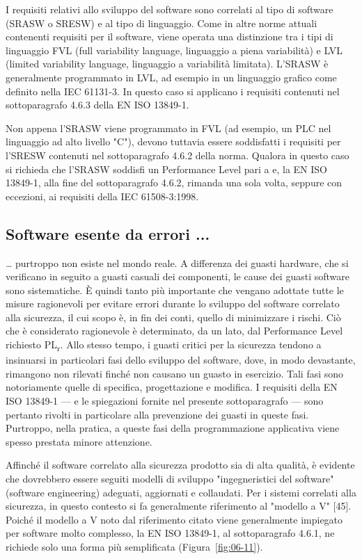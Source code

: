 I requisiti relativi allo sviluppo del software sono correlati al tipo di software (SRASW o SRESW) e al tipo di linguaggio. Come in altre norme attuali contenenti requisiti per il software, viene operata una distinzione tra i tipi di linguaggio FVL (full variability language, linguaggio a piena variabilità) e LVL (limited variability language, linguaggio a variabilità limitata). L'SRASW è generalmente programmato in LVL, ad esempio in un linguaggio grafico come definito nella IEC 61131-3. In questo caso si applicano i requisiti contenuti nel sottoparagrafo 4.6.3 della EN ISO 13849-1.

Non appena l'SRASW viene programmato in FVL (ad esempio, un PLC nel linguaggio ad alto livello "C"), devono tuttavia essere soddisfatti i requisiti per l'SRESW contenuti nel sottoparagrafo 4.6.2 della norma. Qualora in questo caso si richieda che l'SRASW soddisfi un Performance Level pari a e, la EN ISO 13849-1, alla fine del sottoparagrafo 4.6.2, rimanda una sola volta, seppure con eccezioni, ai requisiti della IEC 61508-3:1998.

\subsection{Software esente da errori ...}
\label{subsec:06-3-1}
… purtroppo non esiste nel mondo reale. A differenza dei guasti hardware, che si verificano in seguito a guasti casuali dei componenti, le cause dei guasti software sono sistematiche. È quindi tanto più importante che vengano adottate tutte le misure ragionevoli per evitare errori durante lo sviluppo del software correlato alla sicurezza, il cui scopo è, in fin dei conti, quello di minimizzare i rischi. Ciò che è considerato ragionevole è determinato, da un lato, dal Performance Level richiesto PL\textsubscript{r}. Allo stesso tempo, i guasti critici per la sicurezza tendono a insinuarsi in particolari fasi dello sviluppo del software, dove, in modo devastante, rimangono non rilevati finché non causano un guasto in esercizio. Tali fasi sono notoriamente quelle di specifica, progettazione e modifica. I requisiti della EN ISO 13849-1 — e le spiegazioni fornite nel presente sottoparagrafo — sono pertanto rivolti in particolare alla prevenzione dei guasti in queste fasi. Purtroppo, nella pratica, a queste fasi della programmazione applicativa viene spesso prestata minore attenzione.

Affinché il software correlato alla sicurezza prodotto sia di alta qualità, è evidente che dovrebbero essere seguiti modelli di sviluppo "ingegneristici del software" (software engineering) adeguati, aggiornati e collaudati. Per i sistemi correlati alla sicurezza, in questo contesto si fa generalmente riferimento al "modello a V" [45]. Poiché il modello a V noto dal riferimento citato viene generalmente impiegato per software molto complesso, la EN ISO 13849-1, al sottoparagrafo 4.6.1, ne richiede solo una forma più semplificata (Figura~\ref{fig:06-11}).

